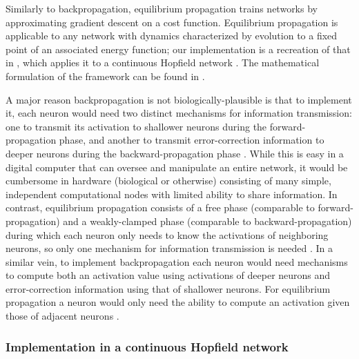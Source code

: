 \documentclass[utf8]{frontiersSCNS}
\begin{document}
Similarly to backpropagation, equilibrium propagation \citep{scellier17} trains networks by approximating gradient descent on a cost function. Equilibrium propagation is applicable to any network with dynamics characterized by evolution to a fixed point of an associated energy function; our implementation is a recreation of that in \citep{scellier17}, which applies it to a continuous Hopfield network \citep{hopfield1984}. The mathematical formulation of the framework can be found in \citep{scellier17}.

A major reason backpropagation is not biologically-plausible is that to implement it, each neuron would need two distinct mechanisms for information transmission: one to transmit its activation to shallower neurons during the forward-propagation phase, and another to transmit error-correction information to deeper neurons during the backward-propagation phase \citep{bengio2015}. While this is easy in a digital computer that can oversee and manipulate an entire network, it would be cumbersome in hardware (biological or otherwise) consisting of many simple, independent computational nodes with limited ability to share information. In contrast, equilibrium propagation consists of a free phase (comparable to forward-propagation) and a weakly-clamped phase (comparable to backward-propagation) during which each neuron only needs to know the activations of neighboring neurons, so only one mechanism for information transmission is needed \citep{scellier17}. In a similar vein, to implement backpropagation each neuron would need mechanisms to compute both an activation value using activations of deeper neurons and error-correction information using that of shallower neurons. For equilibrium propagation a neuron would only need the ability to compute an activation given those of adjacent neurons \citep{scellier17}.

\subsubsection{Implementation in a continuous Hopfield network}
\end{document}
